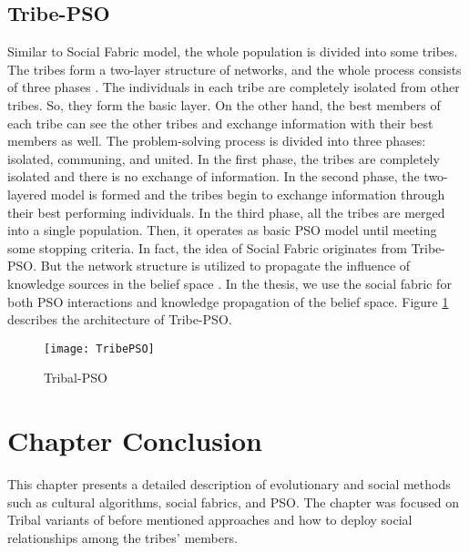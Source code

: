 \subsection{Tribe-PSO}
Similar to Social Fabric model, the whole population is divided into some tribes.  The tribes form a two-layer structure of networks, and the whole process consists of three phases \cite{chen2006tribe}. The individuals in each tribe are completely isolated from other tribes. So, they form the basic layer. On the other hand, the best members of each tribe can see the other tribes and exchange information with their best members as well. The problem-solving process is divided into three phases: isolated, communing, and united. In the first phase, the tribes are completely isolated and there is no exchange of information. In the second phase, the two-layered model is formed and the tribes begin to exchange information through their best performing individuals. In the third phase, all the tribes are merged into a single population. Then, it operates as basic PSO model until meeting some stopping criteria. In fact, the idea of Social Fabric originates from Tribe-PSO. But the network structure is utilized to propagate the influence of knowledge sources in the belief space \cite{ali2016leveraged}. In the thesis, we use the social fabric for both PSO interactions and knowledge propagation of the belief space. Figure \ref{fig:TribePSO} describes the architecture of Tribe-PSO.
\begin{figure}[h]
	\texttt{[image: TribePSO]}
	\centering
	\caption{Tribal-PSO}
	\label{fig:TribePSO}
\end{figure}

\section{Chapter Conclusion}
This chapter presents a detailed description of evolutionary and social methods such as cultural algorithms, social fabrics, and PSO. The chapter was focused on Tribal variants of before mentioned approaches and how to deploy social relationships among the tribes' members. 







